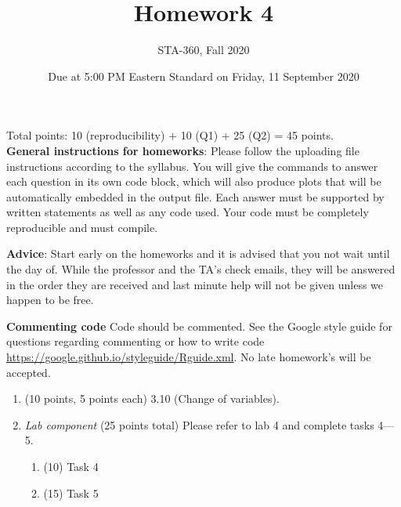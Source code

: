 \documentclass{article}
\begin{document}
\title{Homework 4}
\author{STA-360, Fall 2020}
\date{Due at 5:00 PM Eastern Standard  on Friday, 11 September 2020}
\maketitle

Total points: 10 (reproducibility) + 10 (Q1) + 25 (Q2) = 45 points. \\

\textbf{General instructions for homeworks}: Please follow the uploading file instructions according to the syllabus. You will give the commands to answer each question in its own code block, which will also produce plots that will be automatically embedded in the output file. Each answer must be supported by written statements as well as any code used. Your code must be completely reproducible and must compile. 

\textbf{Advice}: Start early on the homeworks and it is advised that you not wait until the day of. While the professor and the TA's check emails, they will be answered in the order they are received and last minute help will not be given unless we happen to be free.  

\textbf{Commenting code}
Code should be commented. See the Google style guide for questions regarding commenting or how to write 
code \url{https://google.github.io/styleguide/Rguide.xml}. No late homework's will be accepted.


\begin{enumerate}
\item (10 points, 5 points each) 3.10 (Change of variables).


\item {\em Lab component} 
  (25 points total) Please refer to lab 4 and complete tasks 4---5. 
  \begin{enumerate}
  \item (10) Task 4
  \item (15) Task 5
  \end{enumerate}
  
\end{enumerate}
\end{document}
